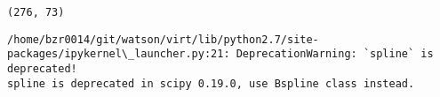 \documentclass[11pt]{article}
\begin{document}
    \begin{Verbatim}[commandchars=\\\{\}]
(276, 73)

    \end{Verbatim}

    \begin{Verbatim}[commandchars=\\\{\}]
/home/bzr0014/git/watson/virt/lib/python2.7/site-packages/ipykernel\_launcher.py:21: DeprecationWarning: `spline` is deprecated!
spline is deprecated in scipy 0.19.0, use Bspline class instead.

    \end{Verbatim}

    \begin{center}
    \end{center}
    { \hspace*{\fill} \\}
    
\end{document}

